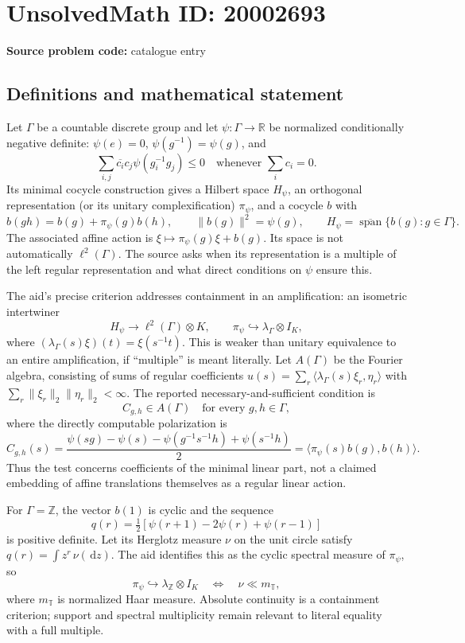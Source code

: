 \documentclass[11pt]{article}
\newcommand{\Z}{\mathbb{Z}}
\newcommand{\R}{\mathbb{R}}
\newcommand{\dd}{\,\mathrm{d}}
\begin{document}
\section*{UnsolvedMath ID: 20002693}
\textbf{Source problem code:} catalogue entry
\subsection{Definitions and mathematical statement}
Let $\Gamma$ be a countable discrete group and let $\psi:\Gamma\to\R$ be normalized conditionally negative definite: $\psi(e)=0$, $\psi(g^{-1})=\psi(g)$, and
\[
 \sum_{i,j}\overline{c_i}c_j\psi(g_i^{-1}g_j)\le0
 \quad\text{whenever }\sum_i c_i=0.
\]
Its minimal cocycle construction gives a Hilbert space $H_\psi$, an orthogonal representation (or its unitary complexification) $\pi_\psi$, and a cocycle $b$ with
\[
 b(gh)=b(g)+\pi_\psi(g)b(h),\qquad
 \|b(g)\|^2=\psi(g),\qquad
 H_\psi=\overline{\operatorname{span}}\{b(g):g\in\Gamma\}.
\]
The associated affine action is $\xi\mapsto\pi_\psi(g)\xi+b(g)$. Its space is not automatically $\ell^2(\Gamma)$. The source asks when its representation is a multiple of the left regular representation and what direct conditions on $\psi$ ensure this.

The aid's precise criterion addresses containment in an amplification: an isometric intertwiner
\[
 H_\psi\longrightarrow\ell^2(\Gamma)\otimes K,
 \qquad \pi_\psi\hookrightarrow\lambda_\Gamma\otimes I_K,
\]
where $(\lambda_\Gamma(s)\xi)(t)=\xi(s^{-1}t)$. This is weaker than unitary equivalence to an entire amplification, if ``multiple'' is meant literally. Let $A(\Gamma)$ be the Fourier algebra, consisting of sums of regular coefficients $u(s)=\sum_r\langle\lambda_\Gamma(s)\xi_r,\eta_r\rangle$ with $\sum_r\|\xi_r\|_2\|\eta_r\|_2<\infty$. The reported necessary-and-sufficient condition is
\[
 C_{g,h}\in A(\Gamma)\quad\text{for every }g,h\in\Gamma,
\]
where the directly computable polarization is
\[
 C_{g,h}(s)=\frac{\psi(sg)-\psi(s)
                    -\psi(g^{-1}s^{-1}h)+\psi(s^{-1}h)}2
           =\langle\pi_\psi(s)b(g),b(h)\rangle.
\]
Thus the test concerns coefficients of the minimal linear part, not a claimed embedding of affine translations themselves as a regular linear action.

For $\Gamma=\Z$, the vector $b(1)$ is cyclic and the sequence
\[
 q(r)=\tfrac12[\psi(r+1)-2\psi(r)+\psi(r-1)]
\]
is positive definite. Let its Herglotz measure $\nu$ on the unit circle satisfy $q(r)=\int z^r\,\nu(\dd z)$. The aid identifies this as the cyclic spectral measure of $\pi_\psi$, so
\[
 \pi_\psi\hookrightarrow\lambda_{\Z}\otimes I_K
 \quad\Longleftrightarrow\quad \nu\ll m_{\mathbb T},
\]
where $m_{\mathbb T}$ is normalized Haar measure. Absolute continuity is a containment criterion; support and spectral multiplicity remain relevant to literal equality with a full multiple.
\end{document}
